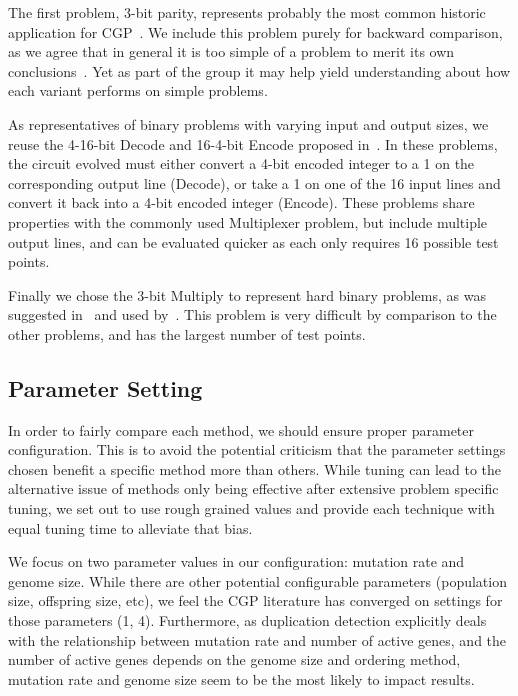 \documentclass[journal]{IEEEtran}
\begin{document}
The first problem, 3-bit parity, represents probably the most
common historic application for
CGP~\cite{yu:2001:neutrality,miller:2006:redundancy,walker:2008:cgpmodules}.
We include this problem purely for backward comparison, as we agree that in general
it is too simple of a problem to merit its own conclusions~\cite{white:2013:bgpb}.
Yet as part of the group it may help yield understanding about how each variant
performs on simple problems.

As representatives of binary problems with varying input and output sizes, we
reuse the 4-16-bit Decode and 16-4-bit Encode proposed in~\cite{goldman:2013:cgpwaste}.
In these problems, the circuit evolved must either convert a 4-bit encoded integer
to a 1 on the corresponding output line (Decode), or take a 1 on one of the 16
input lines and convert it back into a 4-bit encoded integer (Encode).  These
problems share properties with the commonly used Multiplexer problem, but include
multiple output lines, and can be evaluated quicker as each only requires 16 possible
test points.

Finally we chose the 3-bit Multiply to represent hard binary problems,
as was suggested in~\cite{white:2013:bgpb} and used
by~\cite{vassilev:2000:neutrality,miller:2006:redundancy,walker:2008:cgpmodules}.
This problem is very difficult by comparison to the other problems, and has
the largest number of test points.




\subsection{Parameter Setting}
\label{sec:parameter}
In order to fairly compare each method, we should ensure proper parameter configuration.
This is to avoid the potential criticism that the parameter settings chosen benefit
a specific method more than others.  While tuning can lead to the alternative issue
of methods only being effective after extensive problem specific tuning, we set out to use
rough grained values and provide each technique with equal tuning time to alleviate that bias.

We focus on two parameter values in our configuration: mutation rate and genome size.
While there are other potential configurable parameters (population size, offspring size, etc),
we feel the CGP literature has converged on settings for those parameters (1, 4).
Furthermore, as duplication detection explicitly deals with the relationship between
mutation rate and number of active genes, and the number of active genes depends
on the genome size and ordering method, mutation rate and genome size seem to be
the most likely to impact results.
\end{document}

